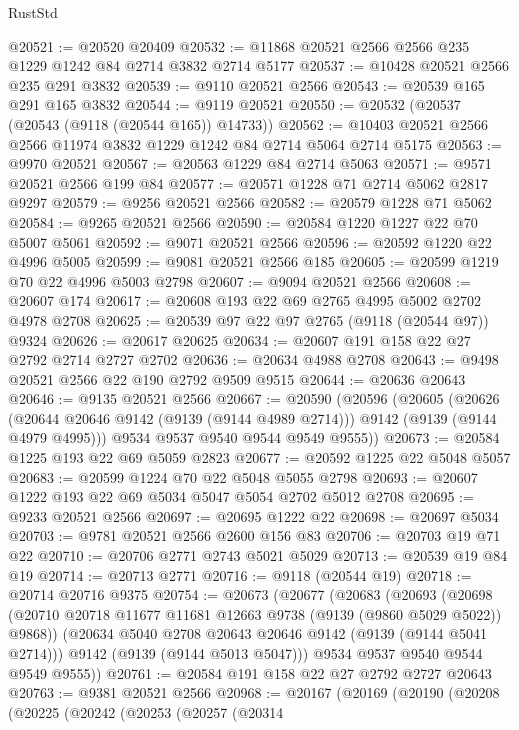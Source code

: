 \begin{lexlean}{RustStd}
\begin{coremodule}
@20521 := @20520 @20409
@20532 := @11868 @20521 @2566 @2566 @235 @1229 @1242 @84 @2714 @3832 @2714 @5177
@20537 := @10428 @20521 @2566 @235 @291 @3832
@20539 := @9110 @20521 @2566
@20543 := @20539 @165 @291 @165 @3832
@20544 := @9119 @20521
@20550 := @20532 (@20537 (@20543 (@9118 (@20544 @165)) @14733))
@20562 := @10403 @20521 @2566 @2566 @11974 @3832 @1229 @1242 @84 @2714 @5064 @2714 @5175
@20563 := @9970 @20521
@20567 := @20563 @1229 @84 @2714 @5063
@20571 := @9571 @20521 @2566 @199 @84
@20577 := @20571 @1228 @71 @2714 @5062 @2817 @9297
@20579 := @9256 @20521 @2566
@20582 := @20579 @1228 @71 @5062
@20584 := @9265 @20521 @2566
@20590 := @20584 @1220 @1227 @22 @70 @5007 @5061
@20592 := @9071 @20521 @2566
@20596 := @20592 @1220 @22 @4996 @5005
@20599 := @9081 @20521 @2566 @185
@20605 := @20599 @1219 @70 @22 @4996 @5003 @2798
@20607 := @9094 @20521 @2566
@20608 := @20607 @174
@20617 := @20608 @193 @22 @69 @2765 @4995 @5002 @2702 @4978 @2708
@20625 := @20539 @97 @22 @97 @2765 (@9118 (@20544 @97)) @9324
@20626 := @20617 @20625
@20634 := @20607 @191 @158 @22 @27 @2792 @2714 @2727 @2702
@20636 := @20634 @4988 @2708
@20643 := @9498 @20521 @2566 @22 @190 @2792 @9509 @9515
@20644 := @20636 @20643
@20646 := @9135 @20521 @2566
@20667 := @20590
    (@20596
      (@20605
        (@20626 (@20644 @20646 @9142 (@9139 (@9144 @4989 @2714))) @9142 (@9139 (@9144 @4979 @4995)))
        @9534
        @9537
        @9540
        @9544
        @9549
        @9555))
@20673 := @20584 @1225 @193 @22 @69 @5059 @2823
@20677 := @20592 @1225 @22 @5048 @5057
@20683 := @20599 @1224 @70 @22 @5048 @5055 @2798
@20693 := @20607 @1222 @193 @22 @69 @5034 @5047 @5054 @2702 @5012 @2708
@20695 := @9233 @20521 @2566
@20697 := @20695 @1222 @22
@20698 := @20697 @5034
@20703 := @9781 @20521 @2566 @2600 @156 @83
@20706 := @20703 @19 @71 @22
@20710 := @20706 @2771 @2743 @5021 @5029
@20713 := @20539 @19 @84 @19
@20714 := @20713 @2771
@20716 := @9118 (@20544 @19)
@20718 := @20714 @20716 @9375
@20754 := @20673
    (@20677
      (@20683
        (@20693
          (@20698 (@20710 @20718 @11677 @11681 @12663 @9738 (@9139 (@9860 @5029 @5022)) @9868))
          (@20634 @5040 @2708 @20643 @20646 @9142 (@9139 (@9144 @5041 @2714)))
          @9142
          (@9139 (@9144 @5013 @5047)))
        @9534
        @9537
        @9540
        @9544
        @9549
        @9555))
@20761 := @20584 @191 @158 @22 @27 @2792 @2727 @20643
@20763 := @9381 @20521 @2566
@20968 := @20167
    (@20169
      (@20190
        (@20208
          (@20225
            (@20242
              (@20253
                (@20257
                  (@20314

\end{coremodule}
\end{lexlean}
